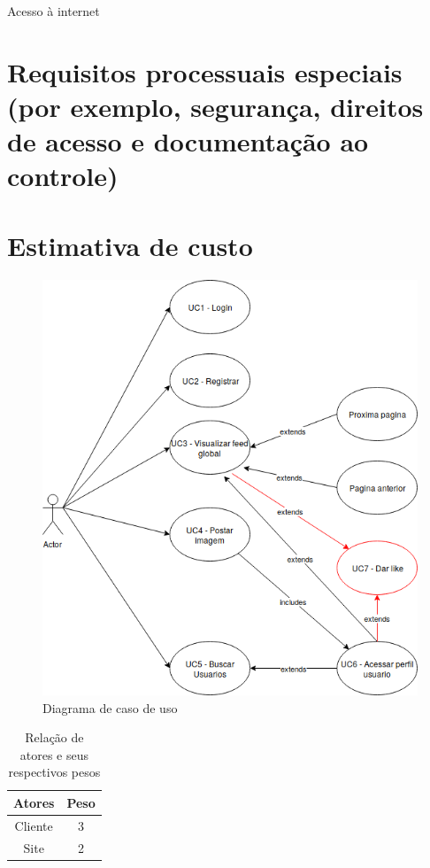 Acesso à internet

\section{Requisitos processuais especiais (por exemplo, segurança, direitos de acesso e documentação ao controle)}

\pagebreak

\section{Estimativa de custo}

\begin{figure}[ht]
	\centering
	\includegraphics[width=\textwidth]{./g/casodeuso.png}
	\caption{Diagrama de caso de uso}
	\label{fig:casoDeUso}
\end{figure}

\begin{table}[!htb]
	\caption[Atores]{Relação de atores e seus respectivos pesos}
	\label{tab:correlacao}
	\centering
	\begin{tabular}{c|c}
		Atores  & Peso 	\\ \hline
		Cliente & 3    	\\
		Site    & 2		\\
	\end{tabular}
\end{table}


